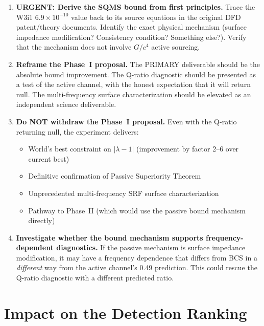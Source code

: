 \documentclass[11pt]{article}
\newcommand{\lbone}{|\lambda - 1|}
\newcommand{\ee}[1]{\times 10^{#1}}
\theoremstyle{definition}
\theoremstyle{remark}
\begin{document}
\begin{enumerate}

\item \textbf{URGENT: Derive the SQMS bound from first principles.}
Trace the W3i1 $6.9\ee{-10}$ value back to its source equations in
the original DFD patent/theory documents. Identify the exact physical
mechanism (surface impedance modification? Consistency condition?
Something else?). Verify that the mechanism does not involve $G/c^4$
active sourcing.

\item \textbf{Reframe the Phase~I proposal.} The PRIMARY deliverable
should be the absolute bound improvement. The Q-ratio diagnostic should
be presented as a test of the active channel, with the honest
expectation that it will return null. The multi-frequency surface
characterization should be elevated as an independent science
deliverable.

\item \textbf{Do NOT withdraw the Phase~I proposal.} Even with the
Q-ratio returning null, the experiment delivers:
\begin{itemize}[nosep]
\item World's best constraint on $\lbone$ (improvement by factor
  2--6 over current best)
\item Definitive confirmation of Passive Superiority Theorem
\item Unprecedented multi-frequency SRF surface characterization
\item Pathway to Phase~II (which would use the passive bound
  mechanism directly)
\end{itemize}

\item \textbf{Investigate whether the bound mechanism supports
frequency-dependent diagnostics.} If the passive mechanism is surface
impedance modification, it may have a frequency dependence that differs
from BCS in a \emph{different} way from the active channel's 0.49
prediction. This could rescue the Q-ratio diagnostic with a different
predicted ratio.

\end{enumerate}


\section{Impact on the Detection Ranking}
\label{sec:ranking}
\end{document}

